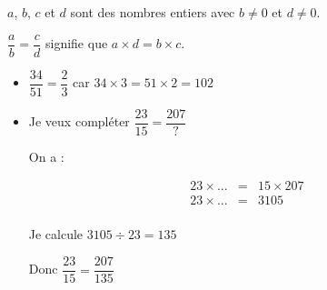 \begin{myprop}
	$a$, $b$, $c$ et $d$  sont des nombres entiers avec $b \neq 0$ et $ d \neq 0$.
	
	$\dfrac{a}{b} = \dfrac{c}{d}$ signifie que $a \times d = b \times c$.
	
	 
\end{myprop}


\begin{myexs}
	\begin{itemize}
		\item $\dfrac{34}{51} = \dfrac{2}{3}$ car $34 \times 3 = 51 \times 2 = 102$
		
		\item Je veux compléter $\dfrac{23}{15} = \dfrac{207}{?}$
		
		On a :
		
		\begin{eqnarray*}
			23 \times ... &=& 15 \times 207 \\
			23 \times ... &=& \num{3105} \\
		\end{eqnarray*}
		
		Je calcule $\num{3105} \div 23 = 135$
		
		\vspace*{0.5cm}
		
		Donc $\dfrac{23}{15} = \dfrac{207}{135}$
	\end{itemize}
	
\end{myexs}